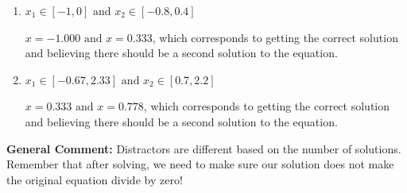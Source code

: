 \documentclass{extbook}[14pt]
\begin{document}
\begin{enumerate}
{\begin{enumerate}[label=\Alph*.]
$x = -1.000$, which corresponds to not distributing the factor $9x -6$ correctly when trying to eliminate the fraction.
\item \( x_1 \in [-1, 0] \text{ and } x_2 \in [-0.8,0.4] \)

$x = -1.000 \text{ and } x = 0.333$, which corresponds to getting the correct solution and believing there should be a second solution to the equation.
\item \( x_1 \in [-0.67, 2.33] \text{ and } x_2 \in [0.7,2.2] \)

$x = 0.333 \text{ and } x = 0.778$, which corresponds to getting the correct solution and believing there should be a second solution to the equation.
\end{enumerate}

\textbf{General Comment:} Distractors are different based on the number of solutions. Remember that after solving, we need to make sure our solution does not make the original equation divide by zero!
}
\end{enumerate}
\end{document}
